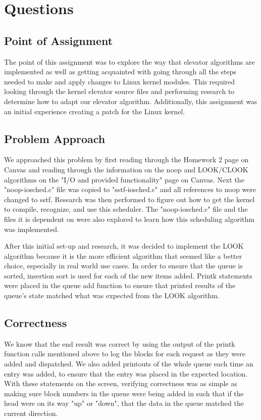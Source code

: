 \section{Questions}
\subsection{Point of Assignment}
The point of this assignment was to explore the way that elevator algorithms are implemented as well as getting acquainted with going through all the steps needed to make and apply changes to Linux kernel modules. This required looking through the kernel elevator source files and performing research to determine how to adapt our elevator algorithm. Additionally, this assignment was an initial experience creating a patch for the Linux kernel.

\subsection{Problem Approach}
We approached this problem by first reading through the Homework 2 page on Canvas and reading through the information on the noop and LOOK/CLOOK algorithms on the "I/O and provided functionality" page on Canvas. Next the "noop-iosched.c" file was copied to "sstf-iosched.c" and all references to noop were changed to sstf. Research was then performed to figure out how to get the kernel to compile, recognize, and use this scheduler. The "noop-iosched.c" file and the files it is dependent on were also explored to learn how this scheduling algorithm was implemented.

After this initial set-up and research, it was decided to implement the LOOK algorithm because it is the more efficient algorithm that seemed like a better choice, especially in real world use cases. In order to ensure that the queue is sorted, insertion sort is used for each of the new items added. Printk statements were placed in the queue add function to ensure that printed results of the queue's state matched what was expected from the LOOK algorithm.

\subsection{Correctness}
We know that the end result was correct by using the output of the printk function calls mentioned above to log the blocks for each request as they were added and dispatched. We also added printouts of the whole queue each time an entry was added, to ensure that the entry was placed in the expected location. With these statements on the screen, verifying correctness was as simple as making sure block numbers in the queue were being added in such that if the head were on its way "up" or "down", that the data in the queue matched the current direction.

